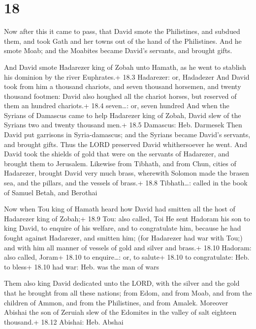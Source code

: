 \hypertarget{section-17}{%
\section{18}\label{section-17}}

 Now after this it came to pass, that David smote the
Philistines, and subdued them, and took Gath and her towns out of the
hand of the Philistines.  And he smote Moab; and the
Moabites became David's servants, and brought gifts.

 And David smote Hadarezer king of Zobah unto Hamath, as
he went to stablish his dominion by the river Euphrates.+ 18.3
Hadarezer: or, Hadadezer  And David took from him a thousand
chariots, and seven thousand horsemen, and twenty thousand footmen:
David also houghed all the chariot horses, but reserved of them an
hundred chariots.+ 18.4 seven\ldots: or, seven hundred  And
when the Syrians of Damascus came to help Hadarezer king of Zobah, David
slew of the Syrians two and twenty thousand men.+ 18.5 Damascus: Heb.
Darmesek  Then David put garrisons in Syria-damascus; and
the Syrians became David's servants, and brought gifts. Thus the LORD
preserved David whithersoever he went.  And David took the
shields of gold that were on the servants of Hadarezer, and brought them
to Jerusalem.  Likewise from Tibhath, and from Chun, cities
of Hadarezer, brought David very much brass, wherewith Solomon made the
brasen sea, and the pillars, and the vessels of brass.+ 18.8
Tibhath\ldots: called in the book of Samuel Betah, and Berothai

 Now when Tou king of Hamath heard how David had smitten
all the host of Hadarezer king of Zobah;+ 18.9 Tou: also called, Toi
 He sent Hadoram his son to king David, to enquire of his
welfare, and to congratulate him, because he had fought against
Hadarezer, and smitten him; (for Hadarezer had war with Tou;) and with
him all manner of vessels of gold and silver and brass.+ 18.10 Hadoram:
also called, Joram+ 18.10 to enquire\ldots: or, to salute+ 18.10 to
congratulate: Heb. to bless+ 18.10 had war: Heb. was the man of wars

 Them also king David dedicated unto the LORD, with the
silver and the gold that he brought from all these nations; from Edom,
and from Moab, and from the children of Ammon, and from the Philistines,
and from Amalek.  Moreover Abishai the son of Zeruiah slew
of the Edomites in the valley of salt eighteen thousand.+ 18.12 Abishai:
Heb. Abshai

